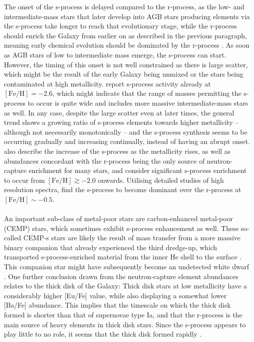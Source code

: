 \documentclass[a4paper,11pt]{article}
\begin{document}
The onset of the s-process is delayed compared to the r-process, as the low- and intermediate-mass stars that later develop into AGB stars producing elements via the s-process take longer to reach that evolutionary stage, while the r-process should enrich the Galaxy from earlier on as described in the previous paragraph, meaning early chemical evolution should be dominated by the r-process \citep{kappeler11}. As soon as AGB stars of low to intermediate mass emerge, the s-process can start. However, the timing of this onset is not well constrained as there is large scatter, which might be the result of the early Galaxy being unmixed or the stars being contaminated at high metallicity. \citet{simmerer04} report s-process activity already at $\mathrm{[Fe/H]}=-2.6$, which might indicate that the range of masses permitting the s-process to occur is quite wide and includes more massive intermediate-mass stars as well. In any case, despite the large scatter even at later times, the general trend shows a growing ratio of s-process elements towards higher metallicity -- although not necessarily monotonically -- and the s-process synthesis seems to be occurring gradually and increasing continually, instead of having an abrupt onset. \citet{sneden08} also describe the increase of the s-process as the metallicity rises, as well as abundances concordant with the r-process being the only source of neutron-capture enrichment for many stars, and consider significant s-process enrichment to occur from $\mathrm{[Fe/H]}\gtrsim-2.0$ onwards. Utilising detailed studies of high resolution spectra, \citet{battistini16} find the s-process to become dominant over the r-process at $\mathrm{[Fe/H]}\sim-0.5$.\\ \\
%
An important sub-class of metal-poor stars are carbon-enhanced metal-poor (CEMP) stars, which sometimes exhibit s-process enhancement as well. These so-called CEMP-s stars are likely the result of mass transfer from a more massive binary companion that already experienced the third dredge-up, which transported s-process-enriched material from the inner He shell to the surface \citep{bisterzo11}. This companion star might have subsequently become an undetected white dwarf \citep{sneden08}. One further conclusion drawn from the neutron-capture element abundances relates to the thick disk of the Galaxy: Thick disk stars at low metallicity have a considerably higher [Eu/Fe] value, while also displaying a somewhat lower [Ba/Fe] abundance. This implies that the timescale on which the thick disk formed is shorter than that of supernovae type Ia, and that the r-process is the main source of heavy elements in thick disk stars. Since the s-process appears to play little to no role, it seems that the thick disk formed rapidly \citep{kappeler11}.\\ \\
\end{document}
